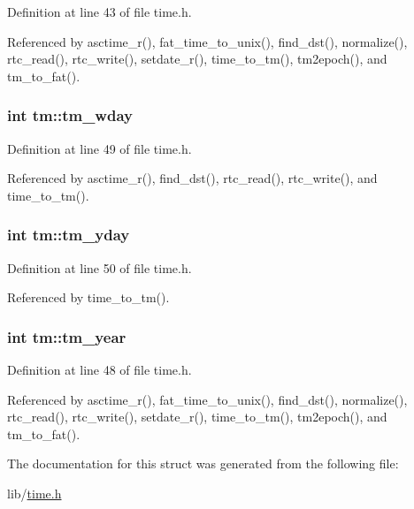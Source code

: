 Definition at line 43 of file time.\+h.



Referenced by asctime\+\_\+r(), fat\+\_\+time\+\_\+to\+\_\+unix(), find\+\_\+dst(), normalize(), rtc\+\_\+read(), rtc\+\_\+write(), setdate\+\_\+r(), time\+\_\+to\+\_\+tm(), tm2epoch(), and tm\+\_\+to\+\_\+fat().

\subsubsection[{\texorpdfstring{tm\+\_\+wday}{tm_wday}}]{\setlength{\rightskip}{0pt plus 5cm}int tm\+::tm\+\_\+wday}\hypertarget{structtm_afe81a8c46f1c693c43f259b288859f4f}{}\label{structtm_afe81a8c46f1c693c43f259b288859f4f}


Definition at line 49 of file time.\+h.



Referenced by asctime\+\_\+r(), find\+\_\+dst(), rtc\+\_\+read(), rtc\+\_\+write(), and time\+\_\+to\+\_\+tm().

\subsubsection[{\texorpdfstring{tm\+\_\+yday}{tm_yday}}]{\setlength{\rightskip}{0pt plus 5cm}int tm\+::tm\+\_\+yday}\hypertarget{structtm_a93a0ba77cc23796df84405dcbcc57eb1}{}\label{structtm_a93a0ba77cc23796df84405dcbcc57eb1}


Definition at line 50 of file time.\+h.



Referenced by time\+\_\+to\+\_\+tm().

\subsubsection[{\texorpdfstring{tm\+\_\+year}{tm_year}}]{\setlength{\rightskip}{0pt plus 5cm}int tm\+::tm\+\_\+year}\hypertarget{structtm_a33adf78fd6476b2120ce3b9c4a852053}{}\label{structtm_a33adf78fd6476b2120ce3b9c4a852053}


Definition at line 48 of file time.\+h.



Referenced by asctime\+\_\+r(), fat\+\_\+time\+\_\+to\+\_\+unix(), find\+\_\+dst(), normalize(), rtc\+\_\+read(), rtc\+\_\+write(), setdate\+\_\+r(), time\+\_\+to\+\_\+tm(), tm2epoch(), and tm\+\_\+to\+\_\+fat().



The documentation for this struct was generated from the following file\+:\begin{DoxyCompactItemize}
\item 
lib/\hyperlink{time_8h}{time.\+h}\end{DoxyCompactItemize}
